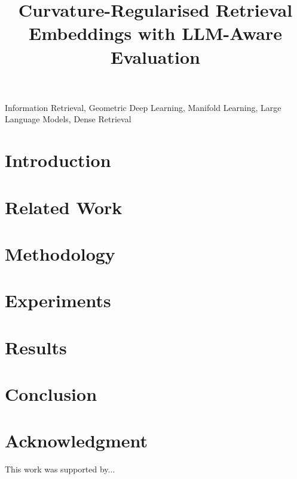 \documentclass[conference]{IEEEtran}
\title{Curvature-Regularised Retrieval Embeddings with LLM-Aware Evaluation}
\author{
    \IEEEauthorblockN{Pablo Pintor}
    \IEEEauthorblockA{Affiliation\\
    Email: pablo.pintor@institution.edu}
}
\begin{document}
\maketitle

\begin{abstract}
    
\end{abstract}

\begin{IEEEkeywords}
    Information Retrieval, Geometric Deep Learning, Manifold Learning, Large Language Models, Dense Retrieval
\end{IEEEkeywords}

\section{Introduction}


\section{Related Work}


\section{Methodology}


\section{Experiments}


\section{Results}


\section{Conclusion}


\section*{Acknowledgment}
This work was supported by...




\appendix

\end{document}
